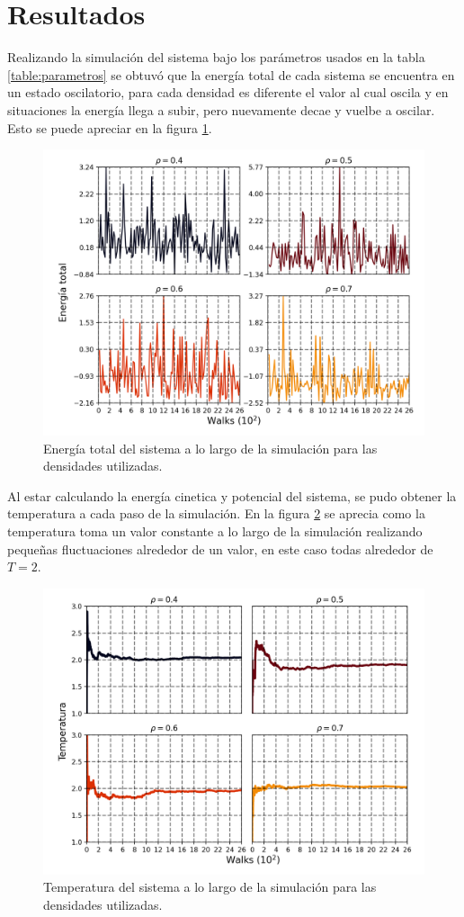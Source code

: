 \section{Resultados}
Realizando la simulación del sistema bajo los parámetros usados en la tabla \ref{table:parametros} se obtuvó que la energía total de cada sistema
se encuentra en un estado oscilatorio, para cada densidad es diferente el valor al cual oscila y en situaciones la energía llega a subir, pero nuevamente 
decae y vuelbe a oscilar. Esto se puede apreciar en la figura \ref{fig:energiatotal}.
\begin{figure}[H]
    \centering
    \includegraphics[scale=0.35]{../Graphics/Energy.png}
    \caption{Energía total del sistema a lo largo de la simulación para las densidades utilizadas.}
    \label{fig:energiatotal}
\end{figure}
Al estar calculando la energía cinetica y potencial del sistema, se pudo obtener la temperatura a cada paso de la simulación. En la figura
\ref{fig:temp} se aprecia como la temperatura toma un valor constante a lo largo de la simulación realizando pequeñas fluctuaciones alrededor
de un valor, en este caso todas alrededor de $T=2$.
\begin{figure}[H]
    \centering
    \includegraphics[scale=0.35]{../Graphics/Temp.png}
    \caption{Temperatura del sistema a lo largo de la simulación para las densidades utilizadas.}
    \label{fig:temp}
\end{figure}
